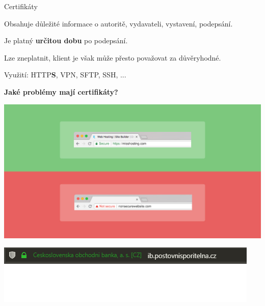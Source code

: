 \documentclass[aspectratio=1610]{beamer}
\begin{document}
\begin{frame}{Certifikáty}
    \begin{cardTiny}
        \begin{flushleft}
            Obsahuje důležité informace o autoritě, vydavateli, vystavení, podepsání.

            Je platný \textbf{určitou dobu} po podepsání.

            Lze zneplatnit, klient je však může přesto považovat za důvěryhodné.
            \vspace{2ex}

            Využití: HTTP\textbf{S}, VPN, SFTP, SSH, ...
        \end{flushleft}
    \end{cardTiny}

    \begin{cardTiny}
        \begin{center}
            \textbf{Jaké problémy mají certifikáty?}
        \end{center}
    \end{cardTiny}
\end{frame}

\begin{frame}
    \includegraphics[width=\textwidth]{img/secure.jpg}
\end{frame}

\begin{frame}
    \includegraphics[width=\textwidth]{img/ps.png}
\end{frame}
\end{document}
